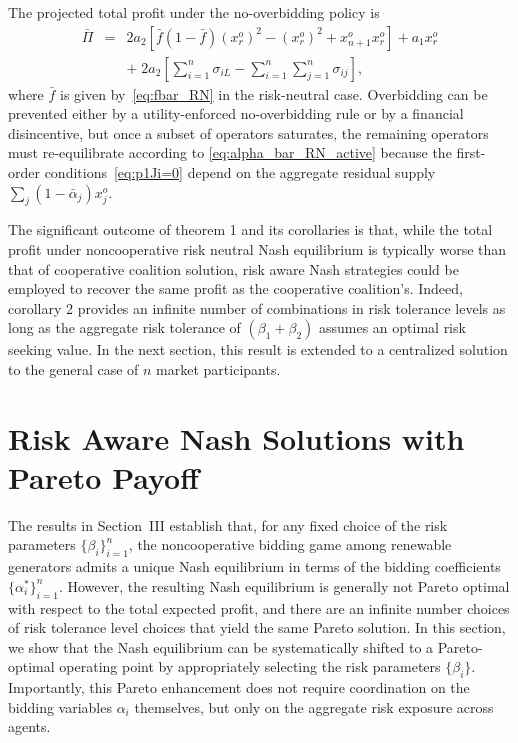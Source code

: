 \documentclass[conference]{IEEEtran}
\begin{document}
The projected total profit under the no-overbidding policy is
\begin{eqnarray}
\bar{\Pi} & = & 2a_2\left[\bar{f}(1-\bar{f})(x_r^o)^2 - (x_r^o)^2 + x_{n+1}^ox_r^o \right] +a_1 x_r^o \nonumber \\
&& + \; 2a_2\left[\sum_{i=1}^n\sigma_{iL} - \sum_{i=1}^n\sum_{j=1}^n\sigma_{ij}\right], \label{eq:Pi_clamp}
\end{eqnarray}
where $\bar{f}$ is given by~\eqref{eq:fbar_RN} in the risk-neutral case. Overbidding can be prevented either by a utility-enforced no-overbidding rule or by a financial disincentive, but once a subset of operators saturates, the remaining operators must re-equilibrate according to \eqref{eq:alpha_bar_RN_active} because the first-order conditions~\eqref{eq:p1Ji=0} depend on the aggregate residual supply $\sum_j(1-\bar{\alpha}_j)x_j^o$.


The significant outcome of theorem 1 and its corollaries is that, while the total profit under noncooperative risk neutral Nash equilibrium is typically worse than that of cooperative coalition solution, risk aware Nash strategies
could be employed to recover the same profit as the cooperative coalition's. Indeed, corollary 2 provides an infinite number of combinations in risk tolerance levels as long as the aggregate risk tolerance of $(\beta_1+\beta_2)$ assumes an optimal risk seeking value. In the next section, this result is extended to a centralized solution to the general case of $n$ market participants. 

\section{Risk Aware Nash Solutions with Pareto Payoff}

The results in Section~III establish that, for any fixed choice of the
risk parameters $\{\beta_i\}_{i=1}^n$, the noncooperative bidding game
among renewable generators admits a unique Nash equilibrium in terms of
the bidding coefficients $\{\alpha_i^\ast\}_{i=1}^n$.
However, the resulting Nash equilibrium is generally not Pareto optimal
with respect to the total expected profit, and there are an infinite number choices of risk tolerance level choices that yield the same Pareto solution. In this section, we show that the Nash equilibrium can be systematically
shifted to a Pareto-optimal operating point by appropriately selecting
the risk parameters $\{\beta_i\}$.
Importantly, this Pareto enhancement does not require coordination on
the bidding variables $\alpha_i$ themselves, but only on the aggregate
risk exposure across agents.
\end{document}
